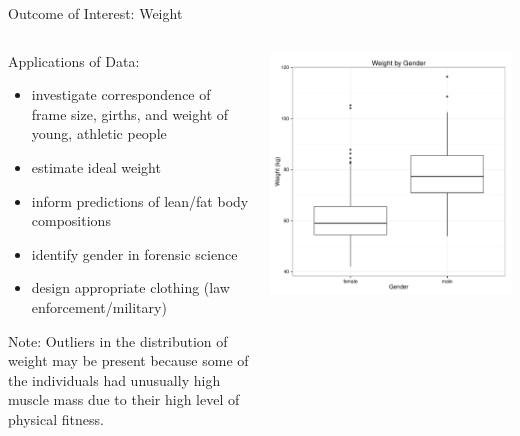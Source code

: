 \documentclass[table]{beamer}\usepackage[]{graphicx}\usepackage[]{color}
\makeatletter
\def\maxwidth{ %
  \ifdim\Gin@nat@width>\linewidth
    \linewidth
  \else
    \Gin@nat@width
  \fi
}
\newenvironment{knitrout}{}{} %
\makeatother
\begin{document}
\begin{frame}{Outcome of Interest: Weight}

\begin{columns}[t] %
\begin{column}[T]{5cm} %
{\fontsize{0.275cm}{1em}\selectfont

Applications of Data: 
\begin {itemize}
  \item investigate correspondence of frame size, girths, and weight of young, athletic people
  \item  estimate ideal weight
  \item  inform predictions of lean/fat body compositions
  \item  identify gender in forensic science
  \item  design appropriate clothing (law enforcement/military) 
\end{itemize}

Note: Outliers in the distribution of weight may be present because some of the individuals had unusually high muscle mass due to their high level of physical fitness.


}
\end{column}

\begin{column}[T]{7cm} 
\begin{knitrout}
\color{fgcolor}
\includegraphics[width=\maxwidth]{figure/weight_plot} 

\end{knitrout}

\end{column}
\end{columns}
\end{frame}
\end{document}
